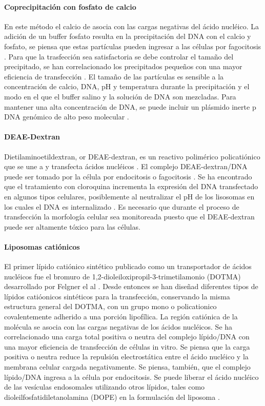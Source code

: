 \documentclass[fleqn,10pt]{SelfArx} %
\begin{document}
\paragraph*{Coprecipitación con fosfato de calcio}
En este método el calcio de asocia con las cargas negativas del ácido nucléico. La adición de un buffer fosfato resulta en la precipitación del DNA con el calcio y fosfato, se piensa que estas partículas pueden ingresar a las células por fagocitosis \cite{Loyter:1982aa}. Para que la trasfección sea satisfactoria se debe controlar el tamaño del precipitado, se han correlacionado los precipitados pequeños con una mayor eficiencia de transfección \cite{Jordan:1996aa}. El tamaño de las partículas es sensible a la concentración de calcio, DNA, pH y temperatura durante la precipitación y el modo en el que el buffer salino y la solución de DNA son mezcladas. Para mantener una alta concentración de DNA, se puede incluir un plásmido inerte p DNA genómico de alto peso molecular \cite{Strain:1985aa}.

\paragraph*{DEAE-Dextran}
Dietilaminoetildextran, or DEAE-dextran, es un reactivo polimérico policatiónico que se une a y transfecta ácidos nucléicos \cite{McCutchan:1968aa}.  El complejo DEAE-dextran/DNA puede ser tomado por la célula por endocitosis o fagocitosis \cite{Yang:1997aa, Luthman:1983aa}. Se ha encontrado que el tratamiento con cloroquina incrementa la expresión del DNA transfectado en algunos tipos celulares, posiblemente al neutralizar el pH de los lisosomas en los cuales el DNA es internalizado \cite{Luthman:1983aa}. Es necesario que durante el proceso de transfección la morfología celular sea monitoreada puesto que el DEAE-dextran puede ser altamente tóxico para las células.

\paragraph*{Liposomas catiónicos}
El primer lípido catiónico sintético publicado como un transportador de ácidos nucléicos fue el bromuro de 1,2-dioleiloxipropil-3-trimetilamonio (DOTMA) desarrollado por Felgner el al \cite{Felgner01111987}. Desde entonces se han diseñad diferentes tipos de lípidos catióonicos sintéticos para la transfección, conservando la misma estructura general del DOTMA, con un grupo mono o policationico covalentemente adherido a una porción lipofílica. La región catiónica de la molécula se asocia con las cargas negativas de los ácidos nucléicos. Se ha correlacionado una carga total positiva o neutra del complejo lípido/DNA con una mayor eficiencia de transfección de células in vitro. Se piensa que la carga positiva o neutra reduce la repulsión electrostática entre el ácido nucléico y la membrana celular cargada negativamente. Se piensa, también, que el complejo lípido/DNA ingresa a la célula por endocitosis.  Se puede liberar el ácido nucléico de las vesículas endosomales utilizando otros lípidos, tales como dioleilfosfatidiletanolamina (DOPE) en la formulación del liposoma \cite{Farhood:1995aa}. 
\end{document}
